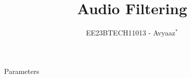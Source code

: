 \documentclass[journal,12pt,twocolumn]{IEEEtran}
\theoremstyle{remark}
\begin{document}

\vspace{3cm}

\title{Audio Filtering}
\author{EE23BTECH11013 - Avyaaz$^{*}$%
}
\maketitle
\newpage
\bigskip

\renewcommand{\thefigure}{\arabic{figure}}
\renewcommand{\thetable}{\arabic{table}}



\begin{table}[htbp]
\setlength{\extrarowheight}{8pt}
\centering
 
 \caption{Parameters}
\label{tab:parameters}
\end{table}
\end{document}
